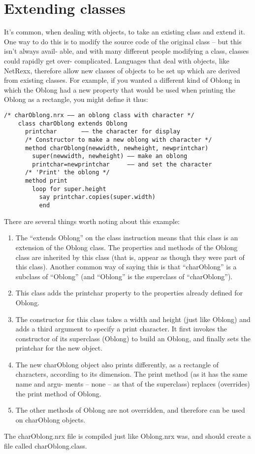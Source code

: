\section{Extending classes}
It’s common, when dealing with objects, to take an existing class and extend it. One way to do this is to modify the source code of the original class – but this isn’t always avail- able, and with many different people modifying a class, classes could rapidly get over- complicated.
Languages that deal with objects, like NetRexx, therefore allow new
classes of objects to be set up which are derived from existing
classes. For example, if you wanted a different kind of Oblong in
which the Oblong had a new property that would be used when printing
the Oblong as a rectangle, you might define it thus:
\begin{lstlisting}[label=charoblong,caption=charOblong.nrx]
    /* charOblong.nrx –– an oblong class with character */
    class charOblong extends Oblong
      printchar       –– the character for display
      /* Constructor to make a new oblong with character */
      method charOblong(newwidth, newheight, newprintchar)
        super(newwidth, newheight) –– make an oblong
        printchar=newprintchar     –– and set the character
      /* 'Print' the oblong */
      method print
        loop for super.height
          say printchar.copies(super.width)
          end
\end{lstlisting}
There are several things worth noting about this example:
\begin{enumerate}
\item The “extends Oblong” on the class instruction means that this class is an extension of the Oblong class. The properties and methods of the Oblong class are inherited by this class (that is, appear as though they were part of this class).
Another common way of saying this is that “charOblong” is a subclass of “Oblong” (and “Oblong” is the superclass of “charOblong”).
\item This class adds the printchar property to the properties already defined for Oblong.
\item The constructor for this class takes a width and height (just like Oblong) and adds a third argument to specify a print character. It first invokes the constructor of its superclass (Oblong) to build an Oblong, and finally sets the printchar for the new object.
\item The new charOblong object also prints differently, as a rectangle of characters, according to its dimension. The print method (as it has the same name and argu- ments – none – as that of the superclass) replaces (overrides) the print method of Oblong.
\item The other methods of Oblong are not overridden, and therefore
  can be used on charOblong objects.
\end{enumerate}
The charOblong.nrx file is compiled just like Oblong.nrx was, and
should create a file called charOblong.class.

